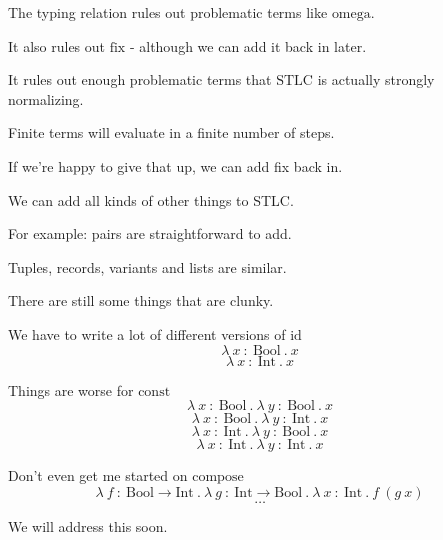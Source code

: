 \begin{frame}
  The typing relation rules out problematic terms like $\text{omega}$.
\end{frame}

\begin{frame}
  It also rules out $\text{fix}$ - although we can add it back in later.
\end{frame}

\begin{frame}
  It rules out enough problematic terms that $\text{STLC}$ is actually strongly normalizing.
\end{frame}

\begin{frame}
  Finite terms will evaluate in a finite number of steps.
\end{frame}

\begin{frame}
  If we're happy to give that up, we can add fix back in.
\end{frame}



\begin{frame}
 We can add all kinds of other things to STLC. 
\end{frame}

\begin{frame}
For example: pairs are straightforward to add.
\end{frame}



\begin{frame}
  Tuples, records, variants and lists are similar.
\end{frame}

\begin{frame}
  There are still some things that are clunky.
\end{frame}

\begin{frame}
  We have to write a lot of different versions of $\text{id}$
  \[ \lambda~x~{:}~\text{Bool}~.~x \]
  \[ \lambda~x~{:}~\text{Int}~.~x \]
\end{frame}

\begin{frame}
  Things are worse for $\text{const}$
  \[ \lambda~x~{:}~\text{Bool}~.~\lambda~y~{:}~\text{Bool}~.~x \]
  \[ \lambda~x~{:}~\text{Bool}~.~\lambda~y~{:}~\text{Int}~.~x \]
  \[ \lambda~x~{:}~\text{Int}~.~\lambda~y~{:}~\text{Bool}~.~x \]
  \[ \lambda~x~{:}~\text{Int}~.~\lambda~y~{:}~\text{Int}~.~x \]
\end{frame}

\begin{frame}
  Don't even get me started on $\text{compose}$
  \[
    \lambda~f~{:}~\text{Bool}\rightarrow\text{Int}~.~\lambda~g~{:}~\text{Int}\rightarrow\text{Bool}~.~\lambda~x~{:}~\text{Int}~.~f~\left(g~x \right) \]
  \[\ldots\]
\end{frame}

\begin{frame}
  We will address this soon.
\end{frame}
